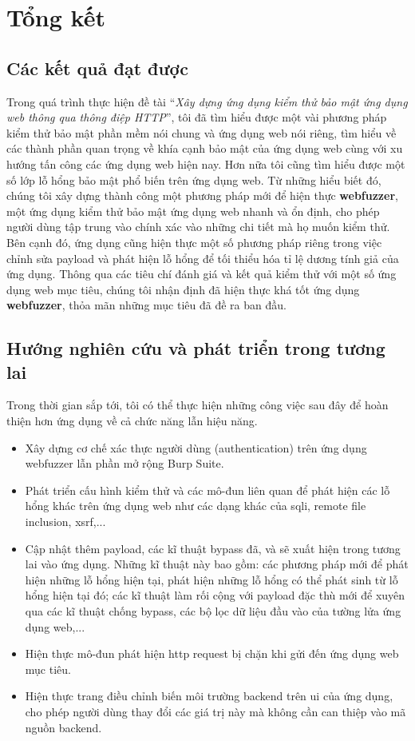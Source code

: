 \chapter{Tổng kết}
\section{Các kết quả đạt được}
Trong quá trình thực hiện đề tài ``\textit{Xây dựng ứng dụng kiểm thử bảo mật ứng dụng web thông qua thông điệp HTTP}'', tôi đã tìm hiểu được một vài phương pháp kiểm thử bảo mật phần mềm nói chung và ứng dụng web nói riêng, tìm hiểu về các thành phần quan trọng về khía cạnh bảo mật của ứng dụng web cùng với xu hướng tấn công các ứng dụng web hiện nay. Hơn nữa tôi cũng tìm hiểu được một số lớp lỗ hổng bảo mật phổ biến trên ứng dụng web. Từ những hiểu biết đó, chúng tôi xây dựng thành công một phương pháp mới để hiện thực \textbf{webfuzzer}, một ứng dụng kiểm thử bảo mật ứng dụng web nhanh và ổn định, cho phép người dùng tập trung vào chính xác vào những chi tiết mà họ muốn kiểm thử. Bên cạnh đó, ứng dụng cũng hiện thực một số phương pháp riêng trong việc chỉnh sửa payload và phát hiện lỗ hổng để tối thiểu hóa tỉ lệ dương tính giả của ứng dụng. Thông qua các tiêu chí đánh giá và kết quả kiểm thử với một số ứng dụng web mục tiêu, chúng tôi nhận định đã hiện thực khá tốt ứng dụng \textbf{webfuzzer}, thỏa mãn những mục tiêu đã đề ra ban đầu.

\section{Hướng nghiên cứu và phát triển trong tương lai}
Trong thời gian sắp tới, tôi có thể thực hiện những công việc sau đây để hoàn thiện hơn ứng dụng về cả chức năng lẫn hiệu năng.
\begin{itemize}
    \item Xây dựng cơ chế xác thực người dùng (authentication) trên ứng dụng webfuzzer lẫn phần mở rộng Burp Suite.
    \item Phát triển cấu hình kiểm thử và các mô-đun liên quan để phát hiện các lỗ hổng khác trên ứng dụng web như các dạng khác của \acrshort{sqli}, remote file inclusion, \acrshort{xsrf},...
    \item Cập nhật thêm payload, các kĩ thuật bypass đã, và sẽ xuất hiện trong tương lai vào ứng dụng. Những kĩ thuật này bao gồm: các phương pháp mới để phát hiện những lỗ hổng hiện tại, phát hiện những lỗ hổng có thể phát sinh từ lỗ hổng hiện tại đó; các kĩ thuật làm rối cộng với payload đặc thù mới để xuyên qua các kĩ thuật chống bypass, các bộ lọc dữ liệu đầu vào của tường lửa ứng dụng web,...
    \item Hiện thực mô-đun phát hiện \acrshort{http} request bị chặn khi gửi đến ứng dụng web mục tiêu.
    \item Hiện thực trang điều chỉnh biến môi trường backend trên \acrshort{ui} của ứng dụng, cho phép người dùng thay đổi các giá trị này mà không cần can thiệp vào mã nguồn backend.
\end{itemize}